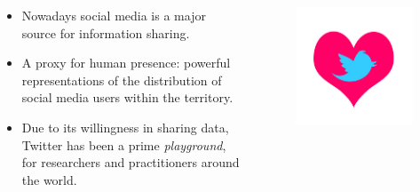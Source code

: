 \documentclass[hyperref={pdfpagelabels=true}]{beamer}
\begin{document}
\begin{frame}
\begin{columns}
\begin{column}{0.7\textwidth}
{  \begin{itemize}    
    \item<1->Nowadays social media is a major source for information sharing. %
    \item<2->A proxy for human presence: powerful representations of the distribution of social media users within the territory.
    \item<3->Due to its willingness in sharing data, Twitter has been a prime \textit{playground}, for researchers and practitioners around the world.  
  \end{itemize} }
  \end{column}
  \begin{column}{0.3\textwidth}        
    \begin{figure}   
      \includegraphics[width=\textwidth]{love.jpg}   
    \end{figure}     
  \end{column}  
\end{columns}    
\end{frame}
\end{document}
